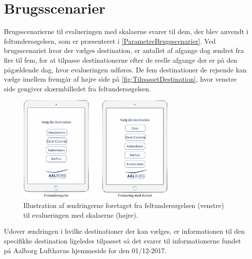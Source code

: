 \section{Brugsscenarier}
\label{TestAfSkalaBrugsscenarier}
%
Brugsscenarierne til evalueringen med skalaerne svarer til dem, der blev anvendt i feltundersøgelsen, som er præsenteret i \autoref{ParametreBrugsscenarier}. Ved brugsscenariet hvor der vælges destination, er antallet af afgange dog ændret fra fire til fem, for at tilpasse destinationerne efter de reelle afgange der er på den pågældende dag, hvor evalueringen udføres. De fem destinationer de rejsende kan vælge imellem fremgår af højre side på \autoref{fig:TilpassetDestination}, hvor venstre side gengiver skærmbilledet fra feltundersøgelsen. 
%
\begin{figure}[H]
\centering
\includegraphics[width =0.7\textwidth]{Figure/TestdesignEvaluering/TilpassetDestination} 
\caption{Illustration af ændringerne foretaget fra feltundersøgelsen (venstre) til evalueringen med skalaerne (højre).}
\label{fig:TilpassetDestination}
\end{figure}
\noindent
%
Udover ændringen i hvilke destinationer der kan vælges, er informationen til den specifikke destination ligeledes tilpasset så det svarer til informationerne fundet på Aalborg Lufthavns hjemmeside for den 01/12-2017. 